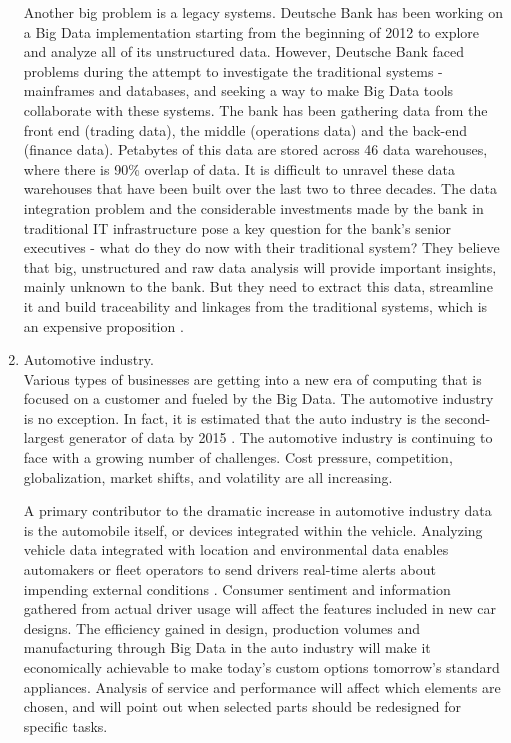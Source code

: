 \documentclass[runningheads]{llncs}
\begin{document}
\begin{enumerate}
Another big problem is a legacy systems. Deutsche Bank has been working on a Big Data implementation starting from the beginning of 2012 to explore and analyze all of its unstructured data. However, Deutsche Bank faced problems during the attempt to investigate the traditional systems - mainframes and databases, and seeking a way to make Big Data tools collaborate with these systems. The bank has been gathering data from the front end (trading data), the middle (operations data) and the back-end (finance data). Petabytes of this data are stored across 46 data warehouses, where there is 90\% overlap of data. It is difficult to unravel these data warehouses that have been built over the last two to three decades. The data integration problem and the considerable investments made by the bank in traditional IT infrastructure pose a key question for the bank's senior executives - what do they do now with their traditional system? They believe that big, unstructured and raw data analysis will provide important insights, mainly unknown to the bank. But they need to extract this data, streamline it and build traceability and linkages from the traditional systems, which is an expensive proposition \cite{PREEZ}.\\

\item Automotive industry.\\

Various types of businesses are getting into a new era of computing that is focused on a customer and fueled by the Big Data. The automotive industry is no exception. In fact, it is estimated that the auto industry is the second-largest generator of data by 2015 \cite{MCKINSEY}. The automotive industry is continuing to face with a growing number of challenges. Cost pressure, competition, globalization, market shifts, and volatility are all increasing.

A primary contributor to the dramatic increase in automotive industry data is the automobile itself, or devices integrated within the vehicle. Analyzing vehicle data integrated with location and environmental data enables automakers or fleet operators to send drivers real-time alerts about impending external conditions \cite{IBMAUTOMOTIVE}. Consumer sentiment and information gathered from actual driver usage will affect the features included in new car designs. The efficiency gained in design, production volumes and manufacturing through Big Data in the auto industry will make it economically achievable to make today's custom options tomorrow's standard appliances. Analysis of service and performance will affect which elements are chosen, and will point out when selected parts should be redesigned for specific tasks.

\end{enumerate}
\end{document}
